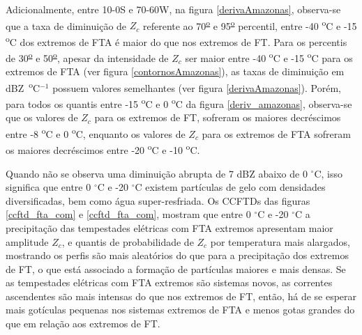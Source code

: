 Adicionalmente, entre 10-0S e 70-60W, na figura \ref{derivaAmazonas}, observa-se que a taxa de diminuição de $Z_c$ referente ao 70\textsuperscript{\underline{o}} e 95\textsuperscript{\underline{o}} percentil, entre -40 \textsuperscript{o}C e -15 \textsuperscript{o}C dos extremos de FTA é maior do que nos extremos de FT. Para os percentis de 30\textsuperscript{\underline{o}} e 50\textsuperscript{\underline{o}}, apesar da intensidade de $Z_c$ ser maior entre -40 \textsuperscript{o}C e -15 \textsuperscript{o}C para os extremos de FTA (ver figura \ref{contornosAmazonas}), as taxas de diminuição em dBZ~\textsuperscript{o}C$^{-1}$ possuem valores semelhantes (ver figura \ref{derivaAmazonas}). Porém, para todos os quantis entre -15 \textsuperscript{o}C e 0 \textsuperscript{o}C da figura \ref{deriv_amazonas}, observa-se que os valores de $Z_c$ para os extremos de FT, sofreram os maiores decréscimos entre -8 \textsuperscript{o}C e 0 \textsuperscript{o}C, enquanto os valores de $Z_c$ para os extremos de FTA sofreram os maiores decréscimos entre -20 \textsuperscript{o}C e -10 \textsuperscript{o}C. %

Quando não se observa uma diminuição abrupta de 7 dBZ abaixo de 0 $^{\circ}$C, isso significa que entre 0 $^{\circ}$C e -20 $^{\circ}$C existem partículas de gelo com densidades diversificadas, bem como água super-resfriada. Os CCFTDs das figuras \ref{ccftd_fta_com} e \ref{ccftd_fta_com}, mostram que entre 0 $^{\circ}$C e -20 $^{\circ}$C a precipitação das tempestades elétricas com FTA extremos apresentam maior amplitude  $Z_c$, e quantis de probabilidade de $Z_c$ por temperatura mais alargados, mostrando os perfis são mais aleatórios do que para a precipitação dos extremos de FT, o que está associado a formação de partículas maiores e mais densas. Se as tempestades elétricas com FTA extremos são sistemas novos, as correntes ascendentes são mais intensas do que nos extremos de FT, então, há de se esperar mais gotículas pequenas nos sistemas extremos de FTA e menos gotas grandes do que em relação aos extremos de FT.

